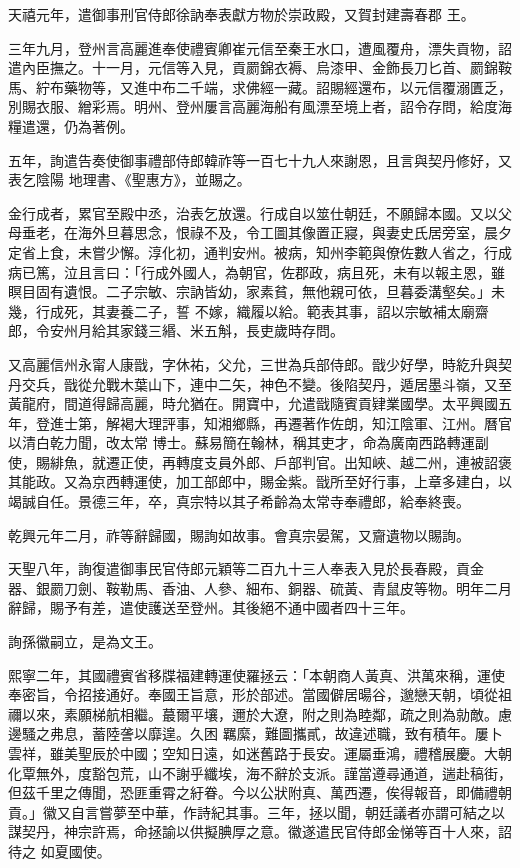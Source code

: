 \begin{pinyinscope}
 天禧元年，遣御事刑官侍郎徐訥奉表獻方物於崇政殿，又賀封建壽春郡
 王。



 三年九月，登州言高麗進奉使禮賓卿崔元信至秦王水口，遭風覆舟，漂失貢物，詔遣內臣撫之。十一月，元信等入見，貢罽錦衣褥、烏漆甲、金飾長刀匕首、罽錦鞍馬、紵布藥物等，又進中布二千端，求佛經一藏。詔賜經還布，以元信覆溺匱乏，別賜衣服、繒彩焉。明州、登州屢言高麗海船有風漂至境上者，詔令存問，給度海糧遣還，仍為著例。



 五年，詢遣告奏使御事禮部侍郎韓祚等一百七十九人來謝恩，且言與契丹修好，又表乞陰陽
 地理書、《聖惠方》，並賜之。



 金行成者，累官至殿中丞，治表乞放還。行成自以筮仕朝廷，不願歸本國。又以父母垂老，在海外旦暮思念，恨祿不及，令工圖其像置正寢，與妻史氏居旁室，晨夕定省上食，未嘗少懈。淳化初，通判安州。被病，知州李範與僚佐數人省之，行成病已篤，泣且言曰：「行成外國人，為朝官，佐郡政，病且死，未有以報主恩，雖瞑目固有遺恨。二子宗敏、宗訥皆幼，家素貧，無他親可依，旦暮委溝壑矣。」未幾，行成死，其妻養二子，誓
 不嫁，織履以給。範表其事，詔以宗敏補太廟齋郎，令安州月給其家錢三緡、米五斛，長吏歲時存問。



 又高麗信州永甯人康戩，字休祐，父允，三世為兵部侍郎。戩少好學，時紇升與契丹交兵，戩從允戰木葉山下，連中二矢，神色不變。後陷契丹，遁居墨斗嶺，又至黃龍府，間道得歸高麗，時允猶在。開寶中，允遣戩隨賓貢肄業國學。太平興國五年，登進士第，解褐大理評事，知湘鄉縣，再遷著作佐朗，知江陰軍、江州。曆官以清白乾力聞，改太常
 博士。蘇易簡在翰林，稱其吏才，命為廣南西路轉運副使，賜緋魚，就遷正使，再轉度支員外郎、戶部判官。出知峽、越二州，連被詔褒其能政。又為京西轉運使，加工部郎中，賜金紫。戩所至好行事，上章多建白，以竭誠自任。景德三年，卒，真宗特以其子希齡為太常寺奉禮郎，給奉終喪。



 乾興元年二月，祚等辭歸國，賜詢如故事。會真宗晏駕，又齎遺物以賜詢。



 天聖八年，詢復遣御事民官侍郎元穎等二百九十三人奉表入見於長春殿，貢金
 器、銀罽刀劍、鞍勒馬、香油、人參、細布、銅器、硫黃、青鼠皮等物。明年二月辭歸，賜予有差，遣使護送至登州。其後絕不通中國者四十三年。



 詢孫徽嗣立，是為文王。



 熙寧二年，其國禮賓省移牒福建轉運使羅拯云：「本朝商人黃真、洪萬來稱，運使奉密旨，令招接通好。奉國王旨意，形於部述。當國僻居暘谷，邈戀天朝，頃從祖禰以來，素願梯航相繼。蕞爾平壤，邇於大遼，附之則為睦鄰，疏之則為勍敵。慮邊騷之弗息，蓄陸詟以靡遑。久困
 羈縻，難圖攜貳，故違述職，致有積年。屢卜雲祥，雖美聖辰於中國；空知日遠，如迷舊路于長安。運屬垂鴻，禮稽展慶。大朝化覃無外，度豁包荒，山不謝乎纖埃，海不辭於支派。謹當遵尋通道，遄赴稿街，但茲千里之傳聞，恐匪重霄之紆眷。今以公狀附真、萬西遷，俟得報音，即備禮朝貢。」徽又自言嘗夢至中華，作詩紀其事。三年，拯以聞，朝廷議者亦謂可結之以謀契丹，神宗許焉，命拯諭以供擬腆厚之意。徽遂遣民官侍郎金悌等百十人來，詔待之
 如夏國使。




\end{pinyinscope}
